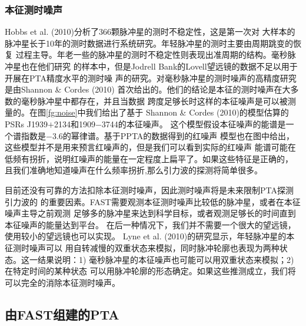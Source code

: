 \subsubsection{本征测时噪声}

Hobbs et al. (2010)\supercite{hlk10}分析了366颗脉冲星的测时不稳定性，这是第一次对
大样本的脉冲星长于10年的测时数据进行系统研究。年轻脉冲星的测时主要由周期跳变的恢复
过程主导。年老一些的脉冲星的测时不稳定性则表现出准周期的结构。毫秒脉冲星也在他们研究
的样本中，但是Jodrell Bank的Lovell望远镜的数据不足以用于开展在PTA精度水平的测时噪
声的研究。对毫秒脉冲星的测时噪声的高精度研究是由Shannon \& Cordes (2010)\supercite{Shannon10}
首次给出的。他们的结论是本征的测时噪声在大多数的毫秒脉冲星中都存在，并且当数据
跨度足够长时这样的本征噪声是可以被测量的。在图\ref{fg:noise}中我们给出了基于
Shannon \& Cordes (2010)的模型估算的PSRs J1939$+$2134和1909$-$3744的本征噪声。
这个模型假设本征噪声的能谱是一个谱指数是$-3.6$的幂律谱。基于PPTA的数据得到的红噪声
模型也在图中给出，这些模型并不是用来预言红噪声的，但是我们可以看到实际的红噪声
能谱可能在低频有拐折，说明红噪声的能量在一定程度上扁平了。如果这些特征是正确的，
且我们准确地知道噪声在什么频率拐折,那么引力波的探测将简单很多。

目前还没有可靠的方法扣除本征测时噪声，因此测时噪声将是未来限制PTA探测引力波的
的重要因素。FAST需要观测本征测时噪声比较低的脉冲星，或者在本征噪声主导之前观测
足够多的脉冲星来达到科学目标，或者观测足够长的时间直到本征噪声的能量达到平台。
在后一种情况下，我们并不需要一个很大的望远镜，使用较小的望远镜也可以实现。
Lyne et al. (2010)\supercite{lhk+10}的研究显示，年轻脉冲星的本征测时噪声可以
用自转减慢的双重状态来模拟，同时脉冲轮廓也表现为两种状态。这一结果说明：1) 
毫秒脉冲星的本征噪声也可能可以用双重状态来模拟；2) 在特定时间的某种状态
可以用脉冲轮廓的形态确定。如果这些推测成立，我们将可以完全的消除本征测时噪声。

\subsection{由FAST组建的PTA}

